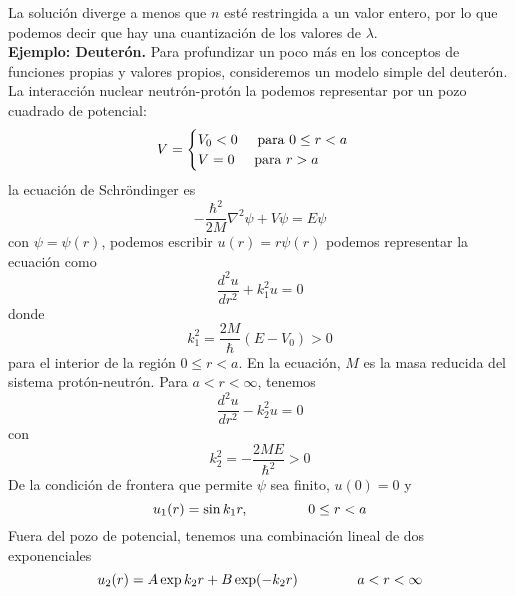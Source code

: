 La solución diverge a menos que $n$ esté restringida a un valor entero, por lo que podemos decir que hay una cuantización de los valores de $\lambda$.
\\
\textbf{Ejemplo: Deuterón.}
Para profundizar un poco más en los conceptos de funciones propias y valores propios, consideremos un modelo simple del deuterón. La interacción nuclear neutrón-protón la podemos representar por un pozo cuadrado de potencial:
\begin{equation*}
V = \begin{cases}
V_{0} < 0 \hspace{0.5cm} \text{para } 0 \leq r < a \\
V = 0 \hspace{0.5cm} \text{para } r > a
\end{cases}
\end{equation*}
la ecuación de Schröndinger es
\begin{equation}
- \dfrac{\hbar^{2}}{2M} \nabla^{2} \psi + V \psi =  E \psi
\label{eq:ecuacion_9}
\end{equation}
con $\psi =  \psi(r)$, podemos escribir $u(r) = r \psi (r)$
podemos representar la ecuación como
\begin{equation}
\dfrac{d^{2} u}{d r^{2}} + k_{1}^{2} u = 0
\label{eq:ecuacion_10}
\end{equation}
donde
\begin{equation}
k_{1}^{2} =  \dfrac{2M}{\hbar} (E - V_{0}) > 0
\label{eq:ecuacion_11}
\end{equation}
para el interior de la región $0 \leq r < a$. En la ecuación, $M$ es la masa reducida del sistema protón-neutrón. Para $a < r < \infty$, tenemos
\begin{equation}
\dfrac{d^{2} u}{d r^{2}} - k_{2}^{2} u = 0
\label{eq:ecuacion_12}
\end{equation}
con
\begin{equation}
k_{2}^{2} = - \dfrac{2ME}{\hbar^{2}} > 0
\label{eq:ecuacion_13}
\end{equation}
De la condición de frontera que permite $\psi$ sea finito, $u(0)=0$ y
\begin{equation}
u_{1}(r) =  \sin k_{1} r, \hspace{1.5cm} 0 \leq r < a
\label{eq:ecuacion_14}
\end{equation}
Fuera del pozo de potencial, tenemos una combinación lineal de dos exponenciales
\begin{equation}
u_{2}(r) = A \exp k_{2} r + B \exp(-k_{2} r) \hspace{1.5cm} a < r < \infty
\label{eq:ecuacion_15}
\end{equation}
